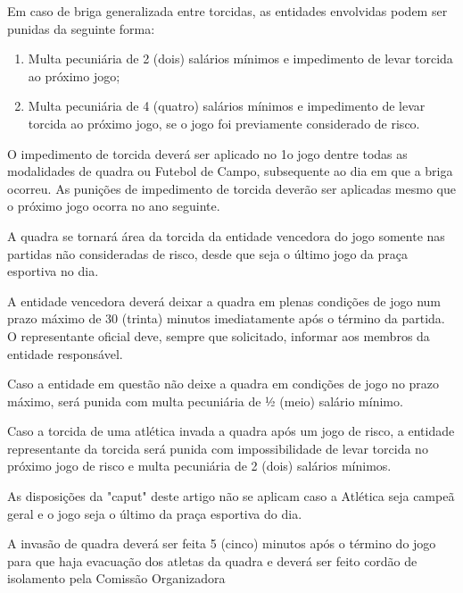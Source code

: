 \begin{article}
	Em caso de briga generalizada entre torcidas, as entidades envolvidas podem ser punidas da seguinte forma:
	
	\begin{enumerate}[noitemsep]
		\item Multa pecuniária de 2 (dois) salários mínimos e impedimento de levar torcida ao próximo jogo;
		\item Multa pecuniária de 4 (quatro) salários mínimos e impedimento de levar torcida ao próximo jogo, se o jogo foi previamente considerado de risco.
	\end{enumerate}
	
	\begin{xparagraph}
	O impedimento de torcida deverá ser aplicado no 1o jogo dentre todas as modalidades de quadra ou Futebol de Campo, subsequente ao dia em que a briga ocorreu. As punições de impedimento de torcida deverão ser aplicadas mesmo que o próximo jogo ocorra no ano seguinte.
	\end{xparagraph}
\end{article}

\begin{article}
	A quadra se tornará área da torcida da entidade vencedora do jogo somente nas partidas não consideradas de risco, desde que seja o último jogo da praça esportiva no dia.
	
	\begin{xparagraph}
	A entidade vencedora deverá deixar a quadra em plenas condições de jogo num prazo máximo de 30 (trinta) minutos imediatamente após o término da partida. O representante oficial deve, sempre que solicitado, informar aos membros da entidade responsável.
	\end{xparagraph}
	
	\begin{xparagraph}
	Caso a entidade em questão não deixe a quadra em condições de jogo no prazo máximo, será punida com multa pecuniária de 1⁄2 (meio) salário mínimo.
	\end{xparagraph}
\end{article}

\begin{article}
	Caso a torcida de uma atlética invada a quadra após um jogo de risco, a entidade representante da torcida será punida com impossibilidade de levar torcida no próximo jogo de risco e multa pecuniária de 2 (dois) salários mínimos.
	
	\begin{xparagraph}
	As disposições da "caput" deste artigo não se aplicam caso a Atlética seja campeã geral e o jogo seja o último da praça esportiva do dia.
	\end{xparagraph}
	
	\begin{xparagraph}
	A invasão de quadra deverá ser feita 5 (cinco) minutos após o término do jogo para que haja evacuação dos atletas da quadra e deverá ser feito cordão de isolamento pela Comissão Organizadora
	\end{xparagraph}
\end{article}

